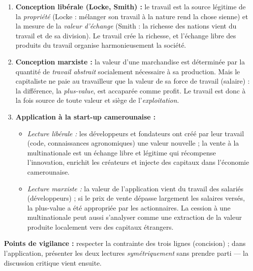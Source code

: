 \documentclass[11pt]{article}
\begin{document}
\begin{corrige}
\begin{enumerate}
    \item \textbf{Conception libérale (Locke, Smith) :} le travail est la source légitime de la \emph{propriété} (Locke : mélanger son travail à la nature rend la chose sienne) et la mesure de la \emph{valeur d'échange} (Smith : la richesse des nations vient du travail et de sa division). Le travail crée la richesse, et l'échange libre des produits du travail organise harmonieusement la société.
    \item \textbf{Conception marxiste :} la valeur d'une marchandise est déterminée par la quantité de \emph{travail abstrait} socialement nécessaire à sa production. Mais le capitaliste ne paie au travailleur que la valeur de sa force de travail (salaire) : la différence, la \emph{plus-value}, est accaparée comme profit. Le travail est donc à la fois source de toute valeur et siège de l'\emph{exploitation}.
    \item \textbf{Application à la start-up camerounaise :}
    \begin{itemize}
        \item \emph{Lecture libérale :} les développeurs et fondateurs ont créé par leur travail (code, connaissances agronomiques) une valeur nouvelle ; la vente à la multinationale est un échange libre et légitime qui récompense l'innovation, enrichit les créateurs et injecte des capitaux dans l'économie camerounaise.
        \item \emph{Lecture marxiste :} la valeur de l'application vient du travail des salariés (développeurs) ; si le prix de vente dépasse largement les salaires versés, la plus-value a été appropriée par les actionnaires. La cession à une multinationale peut aussi s'analyser comme une extraction de la valeur produite localement vers des capitaux étrangers.
    \end{itemize}
\end{enumerate}
\textbf{Points de vigilance :} respecter la contrainte des trois lignes (concision) ; dans l'application, présenter les deux lectures \emph{symétriquement} sans prendre parti — la discussion critique vient ensuite.
\end{corrige}
\end{document}
